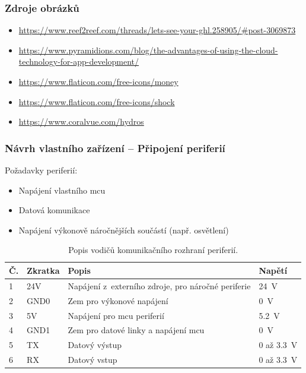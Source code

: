 \documentclass[%
  12pt,       				%
	t,                  %
	aspectratio=1610,   %
	unicode,						%
]{beamer}				    	%
\begin{document}
\begin{frame} [fragile]
	\frametitle{Zdroje obrázků}
	\begin{itemize}
		\item \url{https://www.reef2reef.com/threads/lets-see-your-ghl.258905/#post-3069873}
		\item \url{https://www.pyramidions.com/blog/the-advantages-of-using-the-cloud-technology-for-app-development/}
		\item \url{https://www.flaticon.com/free-icons/money}
		\item \url{https://www.flaticon.com/free-icons/shock}
		\item \url{https://www.coralvue.com/hydros}
	\end{itemize}			
\end{frame}

\begin{frame}[fragile]
	\frametitle{Návrh vlastního zařízení -- Připojení periferií}
	
			Požadavky periferií:\\[1ex]
			\begin{itemize}
				\item Napájení vlastního \acs{mcu}
				\item Datová komunikace 
				\item Napájení výkonově náročnějších součástí (např. osvětlení)
			\end{itemize}
			\vspace{1.5ex}%
			\begin{table}[h!]
				\centering
				\caption{Popis vodičů komunikačního rozhraní periferií.}
				\label{tab:sbernice-popis-vodicu}
				\begin{tabular}{llll}
					\toprule
					\textbf{Č.} & \textbf{Zkratka} & \textbf{Popis} & \textbf{Napětí} \\
					\midrule
					1 & 24V & Napájení z~externího zdroje, pro náročné periferie & \qty{24}{V} \\
					2 & GND0 & Zem pro výkonové napájení & \qty{0}{V}\\
					3 & 5V & Napájení pro \acs{mcu} periferií & \qty{5.2}{V}\\
					4 & GND1 & Zem pro datové linky a napájení \acs{mcu} & \qty{0}{V}\\
					5 & TX & Datový výstup & 0 až \qty{3.3}{V}\\
					6 & RX & Datový vstup & 0 až \qty{3.3}{V}\\
					\bottomrule
				\end{tabular}
			\end{table}
\end{frame}
\end{document}
